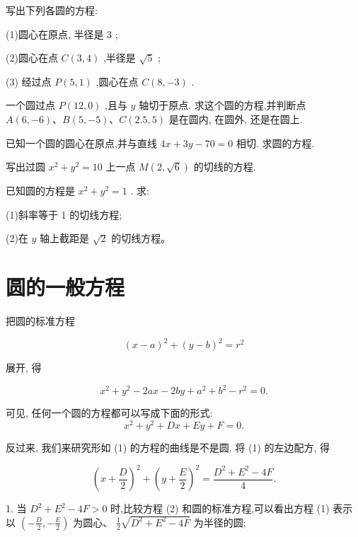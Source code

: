 \documentclass[lang=cn,newtx,10.5pt,scheme=chinese]{elegantbook}
\begin{document}
\begin{problemset}[练习]

\item 写出下列各圆的方程:

(1)圆心在原点, 半径是 3 ;

(2)圆心在点 \(C\left( {3,4}\right)\) ,半径是 \(\sqrt{5}\) ;

(3) 经过点 \(P\left( {5,1}\right)\) ,圆心在点 \(C\left( {8, - 3}\right)\) .

\item 一个圆过点 \(P\left( {{12},0}\right)\) ,且与 \(y\) 轴切于原点. 求这个圆的方程,并判断点 \(A\left( {6, - 6}\right) \text{、}B\left( {5, - 5}\right) \text{、}C\left( {{2.5},5}\right)\) 是在圆内, 在圆外, 还是在圆上.

\item 已知一个圆的圆心在原点,并与直线 \({4x} + {3y} - {70} = 0\) 相切. 求圆的方程.

\item 写出过圆 \({x}^{2} + {y}^{2} = {10}\) 上一点 \(M\left( {2,\sqrt{6}}\right)\) 的切线的方程.

\item 已知圆的方程是 \({x}^{2} + {y}^{2} = 1\) . 求:

(1)斜率等于 1 的切线方程;

(2)在 \(y\) 轴上截距是 \(\sqrt{2}\) 的切线方程。

\end{problemset}

\section{圆的一般方程}

把圆的标准方程

\[
    {\left( x - a\right) }^{2} + {\left( y - b\right) }^{2} = {r}^{2}
\]

展开, 得

\[
    {x}^{2} + {y}^{2} - {2ax} - {2by} + {a}^{2} + {b}^{2} - {r}^{2} = 0.
\]
\begin{definition}[圆的一般方程] 
可见, 任何一个圆的方程都可以写成下面的形式:
\[
    {x}^{2} + {y}^{2} + {Dx} + {Ey} + F = 0. \tag{1}
\]
\end{definition}
反过来, 我们来研究形如 (1) 的方程的曲线是不是圆.
将 (1) 的左边配方, 得

\[
    {\left( x + \frac{D}{2}\right) }^{2} + {\left( y + \frac{E}{2}\right) }^{2} = \frac{{D}^{2} + {E}^{2} - {4F}}{4}. \tag{2}
\]

1. 当 \({D}^{2} + {E}^{2} - {4F} > 0\) 时,比较方程 (2) 和圆的标准方程,可以看出方程 (1) 表示以 \(\left( {-\frac{D}{2}, - \frac{E}{2}}\right)\) 为圆心、 \(\frac{1}{2}\sqrt{{D}^{2} + {E}^{2} - {4F}}\) 为半径的圆;
\end{document}
